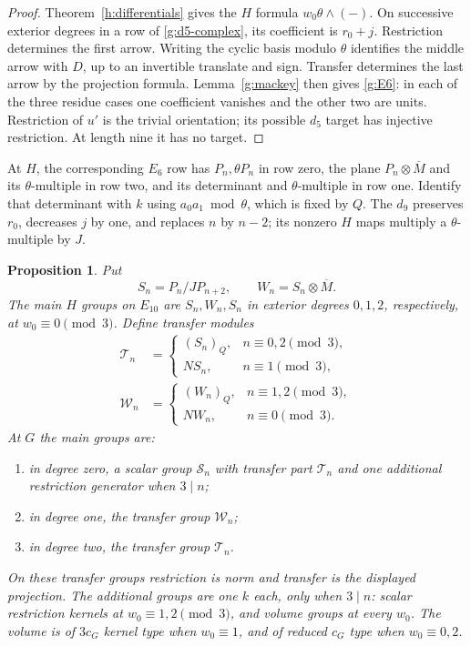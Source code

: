 \documentclass[11pt]{article}
\newtheorem{proposition}[theorem]{Proposition}
\theoremstyle{definition}
\theoremstyle{remark}
\numberwithin{equation}{section}
\begin{document}
\begin{proof}
Theorem~\ref{h:differentials} gives the $H$ formula
$w_0\theta\wedge(-)$.  On successive exterior degrees in a row
of \eqref{g:d5-complex}, its coefficient is $r_0+j$.  Restriction
determines the first arrow.  Writing the cyclic basis modulo
$\theta$ identifies the middle arrow with $D$, up to an
invertible translate and sign.  Transfer determines the last
arrow by the projection formula.  Lemma~\ref{g:mackey} then
gives \eqref{g:E6}: in each of the three residue cases one
coefficient vanishes and the other two are units.  Restriction
of $u'$ is the trivial orientation; its possible $d_5$ target
has injective restriction.  At length nine it has no target.
\end{proof}

At $H$, the corresponding $E_6$ row has $P_n,\theta P_n$ in
row zero, the plane $P_n\otimes\overline M$ and its
$\theta$-multiple in row two, and its determinant and
$\theta$-multiple in row one.  Identify that determinant with
$k$ using $a_0a_1\bmod\theta$, which is fixed by $Q$.
The $d_9$ preserves $r_0$, decreases $j$ by one, and replaces
$n$ by $n-2$; its nonzero $H$ maps multiply a
$\theta$-multiple by $J$.

\begin{proposition}\label{g:E10-description}
Put
\[
 S_n=P_n/JP_{n+2},\qquad W_n=S_n\otimes\overline M.
\]
The main $H$ groups on $E_{10}$ are $S_n,W_n,S_n$ in
exterior degrees $0,1,2$, respectively, at $w_0\equiv0\pmod3$.
Define transfer modules
\begin{align}
 \mathcal T_n&=
 \begin{cases}(S_n)_Q,&n\equiv0,2\pmod3,\\
 NS_n,&n\equiv1\pmod3,
 \end{cases}\label{g:Tn}\\
 \mathcal W_n&=
 \begin{cases}(W_n)_Q,&n\equiv1,2\pmod3,\\
 NW_n,&n\equiv0\pmod3.
 \end{cases}\label{g:Wn}
\end{align}
At $G$ the main groups are:
\begin{enumerate}
\item in degree zero, a scalar group $\mathcal S_n$ with transfer
part $\mathcal T_n$ and one additional restriction generator
when $3\mid n$;
\item in degree one, the transfer group $\mathcal W_n$;
\item in degree two, the transfer group $\mathcal T_n$.
\end{enumerate}
On these transfer groups restriction is norm and transfer is the
displayed projection.  The additional groups are one $k$ each,
only when $3\mid n$: scalar restriction kernels at
$w_0\equiv1,2\pmod3$, and volume groups at every $w_0$.
The volume is of $3c_G$ kernel type when $w_0\equiv1$, and
of reduced $c_G$ type when $w_0\equiv0,2$.
\end{proposition}
\end{document}
